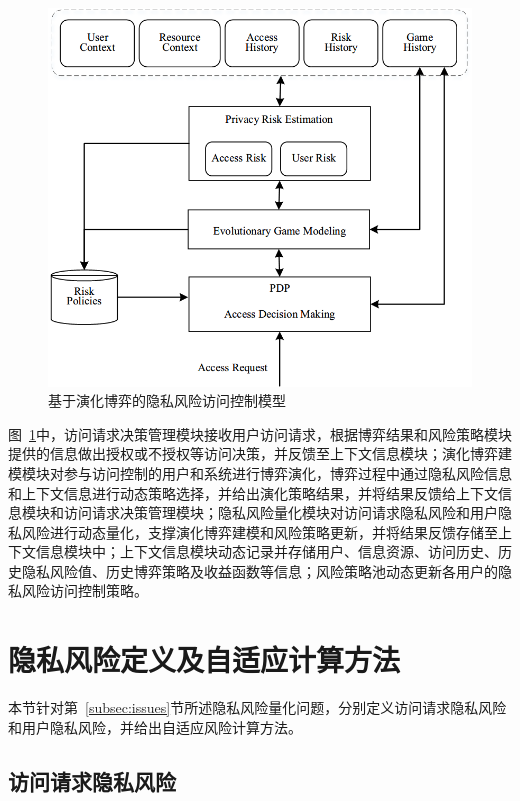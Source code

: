 \begin{figure}[htbp]
	\centering
	\includegraphics[width = 0.6\linewidth]{./figures/Evolutionary-game-Rabac.png}
	\caption{基于演化博弈的隐私风险访问控制模型}
	\label{fig:Evolutionary-game-Rabac}
\end{figure}

图~\ref{fig:Evolutionary-game-Rabac}中，访问请求决策管理模块接收用户访问请求，根据博弈结果和风险策略模块提供的信息做出授权或不授权等访问决策，并反馈至上下文信息模块；演化博弈建模模块对参与访问控制的用户和系统进行博弈演化，博弈过程中通过隐私风险信息和上下文信息进行动态策略选择，并给出演化策略结果，并将结果反馈给上下文信息模块和访问请求决策管理模块；隐私风险量化模块对访问请求隐私风险和用户隐私风险进行动态量化，支撑演化博弈建模和风险策略更新，并将结果反馈存储至上下文信息模块中；上下文信息模块动态记录并存储用户、信息资源、访问历史、历史隐私风险值、历史博弈策略及收益函数等信息；风险策略池动态更新各用户的隐私风险访问控制策略。

\section{隐私风险定义及自适应计算方法}
本节针对第~\ref{subsec:issues}节所述隐私风险量化问题，分别定义访问请求隐私风险和用户隐私风险，并给出自适应风险计算方法。
\subsection{访问请求隐私风险}

